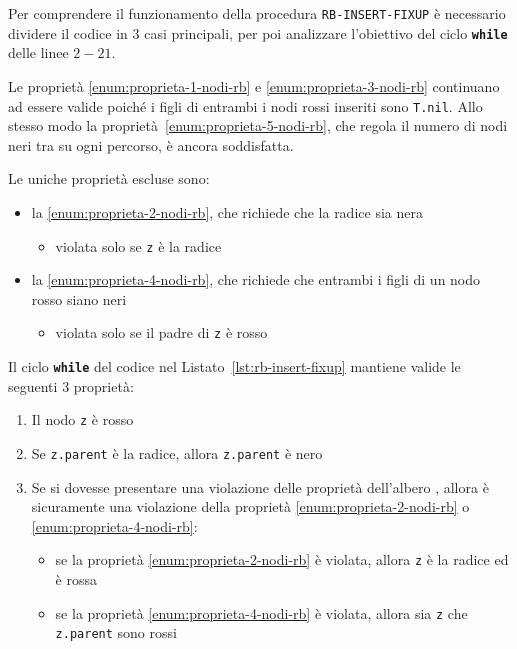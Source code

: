 \documentclass[italian, 10pt]{article}
\begin{document}
Per comprendere il funzionamento della procedura \texttt{RB-INSERT-FIXUP} è necessario dividere il codice in \(3\) casi principali, per poi analizzare l'obiettivo del ciclo \textbf{\texttt{while}} delle linee \(2-21\).

Le proprietà \ref{enum:proprieta-1-nodi-rb} e \ref{enum:proprieta-3-nodi-rb} continuano ad essere valide poiché i figli di entrambi i nodi rossi inseriti sono \texttt{T.nil}.
Allo stesso modo la proprietà~\ref{enum:proprieta-5-nodi-rb}, che regola il numero di nodi neri tra su ogni percorso, è ancora soddisfatta.

Le uniche proprietà escluse sono:

\begin{itemize}
  \item la \ref{enum:proprieta-2-nodi-rb}, che richiede che la radice sia nera
        \begin{itemize}
          \item violata solo se \texttt{z} è la radice
        \end{itemize}
  \item la \ref{enum:proprieta-4-nodi-rb}, che richiede che entrambi i figli di un nodo rosso siano neri
        \begin{itemize}
          \item violata solo se il padre di \texttt{z} è rosso
        \end{itemize}
\end{itemize}

\bigskip
Il ciclo \textbf{\texttt{while}} del codice nel Listato~\ref{lst:rb-insert-fixup} mantiene valide le seguenti \(3\) proprietà:

\begin{enumerate}
  \item Il nodo \texttt{z} è rosso
  \item Se \texttt{z.parent} è la radice, allora \texttt{z.parent} è nero
  \item Se si dovesse presentare una violazione delle proprietà dell'albero \RB, allora è sicuramente una violazione della proprietà \ref{enum:proprieta-2-nodi-rb} o \ref{enum:proprieta-4-nodi-rb}:
        \begin{itemize}
          \item se la proprietà \ref{enum:proprieta-2-nodi-rb} è violata, allora \texttt{z} è la radice ed è rossa
          \item se la proprietà \ref{enum:proprieta-4-nodi-rb} è violata, allora sia \texttt{z} che \texttt{z.parent} sono rossi
        \end{itemize}
\end{enumerate}
\end{document}
